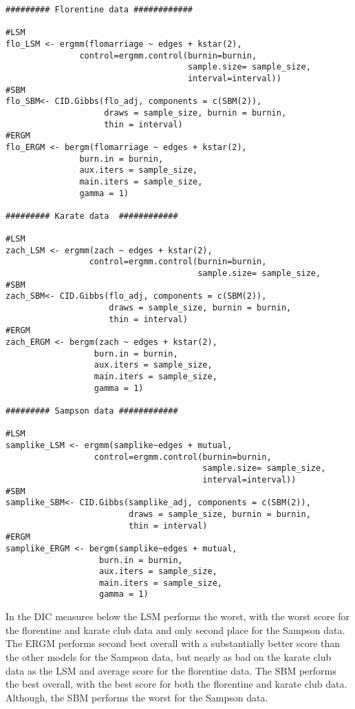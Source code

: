 \documentclass{article}
\begin{document}
\begin{verbatim}
######### Florentine data ############

#LSM
flo_LSM <- ergmm(flomarriage ~ edges + kstar(2),
               control=ergmm.control(burnin=burnin,
                                     sample.size= sample_size,
                                     interval=interval))
#SBM
flo_SBM<- CID.Gibbs(flo_adj, components = c(SBM(2)), 
                    draws = sample_size, burnin = burnin,
                    thin = interval)
#ERGM
flo_ERGM <- bergm(flomarriage ~ edges + kstar(2),
               burn.in = burnin,
               aux.iters = sample_size,
               main.iters = sample_size,
               gamma = 1)

######### Karate data  ############

#LSM
zach_LSM <- ergmm(zach ~ edges + kstar(2),
                 control=ergmm.control(burnin=burnin,
                                       sample.size= sample_size,
#SBM
zach_SBM<- CID.Gibbs(flo_adj, components = c(SBM(2)), 
                     draws = sample_size, burnin = burnin,
                     thin = interval)
#ERGM
zach_ERGM <- bergm(zach ~ edges + kstar(2),
                  burn.in = burnin,
                  aux.iters = sample_size,
                  main.iters = sample_size,
                  gamma = 1)

######### Sampson data ############

#LSM
samplike_LSM <- ergmm(samplike~edges + mutual,
                  control=ergmm.control(burnin=burnin,
                                        sample.size= sample_size,
                                        interval=interval))
#SBM
samplike_SBM<- CID.Gibbs(samplike_adj, components = c(SBM(2)), 
                         draws = sample_size, burnin = burnin,
                         thin = interval)
#ERGM
samplike_ERGM <- bergm(samplike~edges + mutual,
                   burn.in = burnin,
                   aux.iters = sample_size,
                   main.iters = sample_size,
                   gamma = 1)
\end{verbatim}

In the DIC measures below the LSM performs the worst, with the worst score for the florentine and karate club data and only second place for the Sampson data. The ERGM performs second best overall with a substantially better score than the other models for the Sampson data, but nearly as bad on the karate club data as the LSM and average score for the florentine data. The SBM performs the best overall, with the best score for both the florentine and karate club data. Although, the SBM performs the worst for the Sampson data. 
\end{document}
